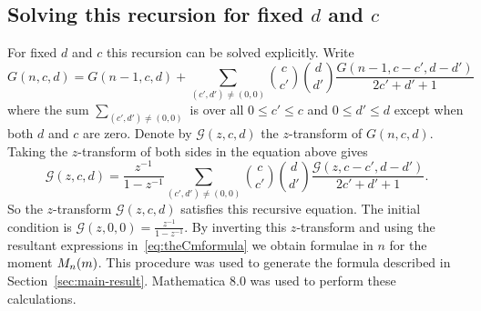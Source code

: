 \documentclass[draftcls, onecolumn, 11pt]{IEEEtran}
\begin{document}
\subsection{Solving this recursion for fixed $d$ and $c$}\label{sec:solv-this-recurs}
\newcommand{\calG}{\mathcal G}

For fixed $d$ and $c$ this recursion can be solved explicitly.  Write
\[
G(n,c,d) = G(n-1,c,d) + \sum_{ (c',d') \neq (0,0)} \binom{c}{c'}\binom{d}{d'} \frac{G(n-1,c-c',d-d')}{2c'+d'+1}
\]
where the sum $\sum_{ (c',d') \neq (0,0)}$ is over all $0 \leq c' \leq c$ and $0 \leq d' \leq d$ except when both $d$ and $c$ are zero.  Denote by $\calG(z,c,d)$ the $z$-transform of $G(n,c,d)$.  Taking the $z$-transform of both sides in the equation above gives
\[
\calG(z,c,d) = \frac{z^{-1}}{1-z^{-1}} \sum_{ (c',d') \neq (0,0)} \binom{c}{c'}\binom{d}{d'} \frac{\calG(z,c-c',d-d')}{2c'+d'+1}.
\]
So the $z$-transform $\calG(z,c,d)$ satisfies this recursive equation.  The initial condition is $\calG(z,0,0) = \frac{z^{-1}}{1 - z^{-1}}$.  By inverting this $z$-transform and using the resultant expressions in~\eqref{eq:theCmformula} we obtain formulae in $n$ for the moment $M_n(m)$.  This procedure was used to generate the formula described in Section~\ref{sec:main-result}.  Mathematica 8.0 was used to perform these calculations.




\small





\end{document}

